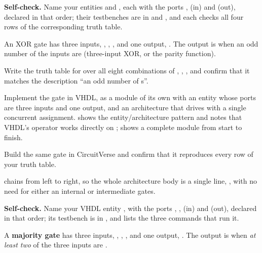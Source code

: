 
\begin{selfcheck}
\textbf{Self-check.} Name your entities  and , each with the ports
,  (in) and  (out), declared in that order; their testbenches are in
 and , and each checks all four rows of the
corresponding truth table.
\end{selfcheck}

\label{c1:ex:xor3}
An XOR gate has three inputs, , , , and one output, . The output is
 when an odd number of the inputs are  (three-input XOR, or the parity function).

 Write the truth table for  over all eight combinations of , ,
, and confirm that it matches the description ``an odd number of s''.

 Implement the gate in VHDL, as a module of its own with an entity whose ports are three
 inputs and one  output, and an architecture that drives 
with a single concurrent assignment.  shows the entity/architecture pattern and
notes that VHDL's  operator works directly on ; 
shows a complete module from start to finish.

 Build the same gate in CircuitVerse and confirm that it reproduces every row of your
truth table.

\note[Hint] chains from left to right, so the whole architecture body is a single line,
, with no need for either an internal  or intermediate
gates.


\begin{selfcheck}
\textbf{Self-check.} Name your VHDL entity , with the ports , ,
 (in) and  (out), declared in that order; its testbench is in
, and  lists the three commands that run it.
\end{selfcheck}

\label{c1:ex:majority3}
A \textbf{majority gate} has three inputs, , , , and one output, .
The output is  when \emph{at least two} of the three inputs are .

